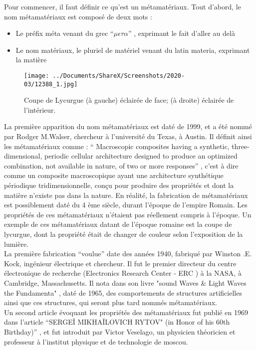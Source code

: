 \documentclass[12pt,a4paper]{article}
\begin{document}
\setlength{\parindent}{1cm} Pour commencer, il faut définir ce qu’est un métamatériaux. Tout d’abord, le nom métamatériaux est composé de deux mots :
\begin{itemize}
\item Le préfix méta venant du grec $“\mu\epsilon\tau\alpha”$ , exprimant le fait d’aller au delà 
\item Le nom matériaux, le pluriel de matériel venant du latin materia, exprimant la matière
\end{itemize} 
\begin{wrapfigure}{l}{0.5\textwidth}\centering
 \texttt{[image: ../Documents/ShareX/Screenshots/2020-03/12388\_1.jpg]}
 \caption{Coupe de Lycurgue (à gauche) éclairée de face; (à droite) éclairée de l'intérieur. }
\end{wrapfigure}
  
La première apparition du nom métamatériaux est daté de 1999, et a été nommé par Rodger M.Walser, chercheur à l’université du Texas, à Austin. Il définit ainsi les métamatériaux comme : “ Macroscopic composites having a synthetic, three-dimensional, periodic cellular architecture designed to produce an optimized combination, not available in nature, of two or more responses” \cite{Fan2017}, c’est à dire comme un composite macroscopique ayant une architecture synthétique périodique tridimensionnelle, conçu pour produire des propriétés et dont la matière n’existe pas dans la nature. En réalité, la fabrication de métamatériaux est possiblement daté du 4 ème siècle, durant l’époque de l’empire Romain. Les propriétés de ces métamatériaux n’étaient pas réellement compris à l’époque. Un exemple de ces métamatériaux datant de l’époque romaine est la coupe de lycurgue, dont la propriété était de changer de couleur selon l’exposition de la lumière.\cite{Thakur}\\

 La première fabrication “voulue” date des années 1940, fabriqué par Winston .E. Kock, ingénieur électrique et chercheur. Il fut le premier directeur du centre électronique de recherche (Electronics Research Center - ERC ) à la NASA, à Cambridge, Massachusetts. Il nota dans son livre "sound Waves \& Light Waves the Fundamenta"\cite{Kock} , daté de 1965, des comportements de structures artificielles ainsi que ces structures, qui seront plus tard nommés métamatériaux.\\

	Un second article évoquant les propriétés des métamatériaux fut publié en 1969 dans l’article “SERGEĬ MIKHAĬLOVICH RYTOV" (in Honor of his 60th Birthday)” \cite{Veselago}, et fut introduit par Victor Veselago, un physicien théoricien et professeur à l’institut physique et de technologie de moscou.  \\
	
\end{document}
